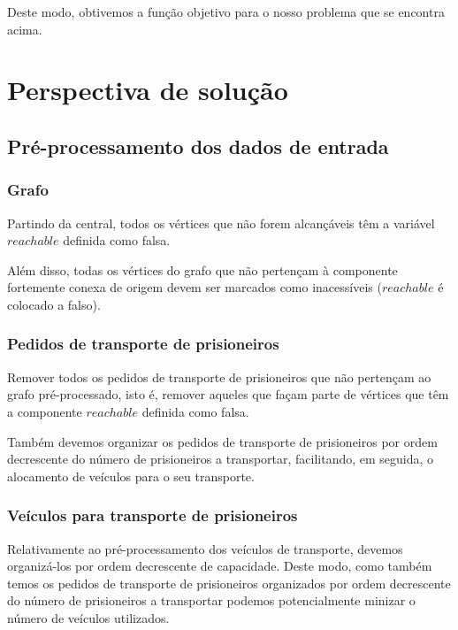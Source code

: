 \documentclass[article, a4paper, 12pt, oneside]{memoir}
\begin{document}
Deste modo, obtivemos a função objetivo para o nosso problema que se encontra acima.

\newpage
\chapter[Perspectiva de solução][Perspectiva de solução]{Perspectiva de solução} \label{\thechapter}

\section{Pré-processamento dos dados de entrada}

\subsection{Grafo}
Partindo da central, todos os vértices que não forem alcançáveis têm a variável $reachable$ definida como falsa.

Além disso, todas os vértices do grafo que não pertençam à componente fortemente conexa de origem devem ser marcados como inacessíveis ($reachable$ é colocado a falso).

\subsection{Pedidos de transporte de prisioneiros}
Remover todos os pedidos de transporte de prisioneiros que não pertençam ao grafo pré-processado, isto é, remover aqueles que façam parte de vértices que têm a componente $reachable$ definida como falsa.

Também devemos organizar os pedidos de transporte de prisioneiros por ordem decrescente do número de prisioneiros a transportar, facilitando, em seguida, o alocamento de veículos para o seu transporte.

\subsection{Veículos para transporte de prisioneiros}
Relativamente ao pré-processamento dos veículos de transporte, devemos organizá-los por ordem decrescente de capacidade. Deste modo, como também temos os pedidos de transporte de prisioneiros organizados por ordem decrescente do número de prisioneiros a transportar podemos potencialmente minizar o número de veículos utilizados.
\end{document}
